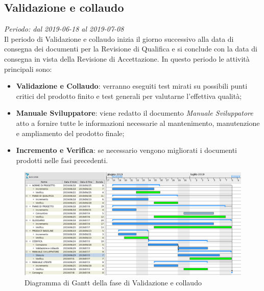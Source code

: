 \subsection{Validazione e collaudo}
\textit{Periodo: dal 2019-06-18 al 2019-07-08 } \\
Il periodo di Validazione e collaudo inizia il giorno successivo alla data di consegna dei documenti per la 
Revisione di Qualifica e si conclude con la data di consegna in vista della Revisione di Accettazione. In questo periodo le attività principali sono:
\begin{itemize}
	\item \textbf{Validazione e Collaudo}: verranno eseguiti test mirati su possibili punti critici del prodotto finito e test generali per valutarne l'effettiva qualità;
	\item \textbf{Manuale Sviluppatore}: viene redatto il documento \textit{Manuale Sviluppatore} atto a fornire tutte le informazioni necessarie al mantenimento, manutenzione e ampliamento del prodotto finale;
	\item \textbf{Incremento e Verifica}: se necessario vengono migliorati i 
	documenti prodotti nelle fasi precedenti.
\end{itemize}
\begin{figure}[H]
	\includegraphics[width=0.99\linewidth]{res/images/gantt_val.png}
	\caption{Diagramma di Gantt della fase di Validazione e collaudo}
\end{figure}